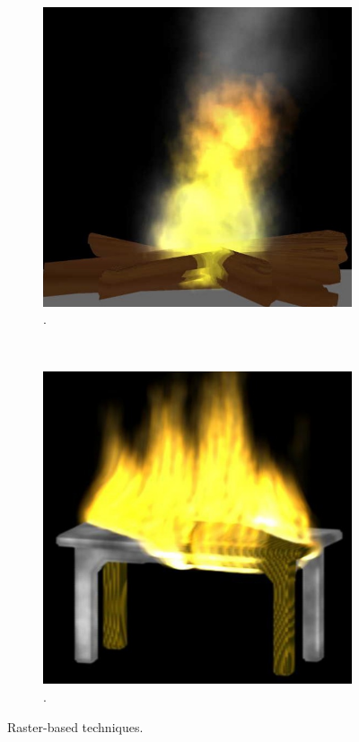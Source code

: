 \begin{figure}[htpb!]
        \centering
       \begin{subfigure}[t]{0.3\textwidth}
                \includegraphics[width=\textwidth]{img/wei_2002}
                \caption{\cite{Wei:2002}.}
        \end{subfigure}%
        ~        
        \begin{subfigure}[t]{0.3\textwidth}
                \includegraphics[width=\textwidth]{img/zhao_2003}
                \caption{\cite{Zhao:2003}.}
        \end{subfigure}%
        \caption{Raster-based techniques.}
        \label{fig:raster_based}
\end{figure}



